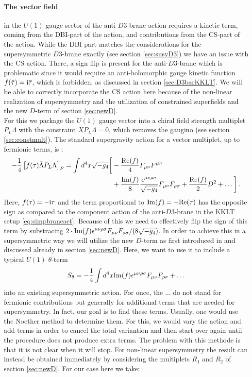\documentclass[a4paper,12pt]{report}
\newcommand{\be}{\begin{equation}}
\newcommand{\ee}{\end{equation}}
\newcommand{\bea}{\begin{equation}\begin{aligned}}
\newcommand{\eea}{\end{aligned}\end{equation}}
\def\rmi{{\rm i}}
\def\rmre{{\rm Re}}
\def\rmim{{\rm Im}}
\begin{document}
\paragraph{The vector field} in the $U(1)$ gauge sector of the anti-$D3$-brane action requires a kinetic term, coming from the DBI-part of the action, and contributions from the CS-part of the action. While the DBI part matches the considerations for the supersymmetric $D3$-brane exactly (see section \ref{sec:susyD3}) we have an issue with the CS action. There, a sign flip is present for the anti-$D3$-brane which is problematic since it would require an anti-holomorphic gauge kinetic function $f(\bar{\tau}) = \rmi \bar{\tau}$, which is forbidden, as discussed in section \ref{sec:D3barKKLT}. We will be able to correctly incorporate the CS action here because of the non-linear realization of supersymmetry and the utilization of constrained superfields and the new $D$-term of section \ref{sec:newD}.\\
For this we package the $U(1)$ gauge vector into a chiral field strength multiplet $P_L\Lambda$ with the constraint $X P_L\Lambda = 0$, which removes the gaugino (see section \ref{sec:constmult}). The standard supergravity action for a vector multiplet, up to fermionic terms, is \cite{Freedman:2012zz}:
\bea
-\frac{1}{4} \left[f(\tau)\bar{\Lambda}P_L\Lambda\right]_F = \int d^4x \sqrt{-g_4}\bigg[&-\frac{\rmre(f)}{4} F_{\mu\nu}F^{\mu\nu}\\
&+\frac{\rmim(f)}{8}\frac{\epsilon^{\mu\nu\rho\sigma}}{\sqrt{-g_4}}F_{\mu\nu}F_{\rho\sigma}+\frac{\rmre(f)}{2}D^2 + \dots \bigg]\,.
\eea
Here, $f(\tau) = -\rmi \tau$ and the term proportional to $\rmim(f)=-\rmre(\tau)$ has the opposite sign as compared to the component action of the anti-$D3$-brane in the KKLT setup \eqref{eq:simpbraneact}. Because of this we need to effectively flip the sign of this term by substracing $2 \cdot \rmim(f) \epsilon^{\nu\nu\rho\sigma}F_{\mu\nu}F_{\rho\sigma}/(8 \sqrt{-g_4})$. In order to achieve this in a supersymmetric way we will utilize the new $D$-term as first introduced in \cite{Cribiori:2017laj} and discussed already in section \ref{sec:newD}. Here, we want to use it to include a typical $U(1)$ $\theta$-term
\be 
S_{\theta} = -\frac{1}{4} \int d^4x \rmim(f)\epsilon^{\mu\nu\rho\sigma}F_{\mu\nu}F_{\rho\sigma} + \ldots
\label{eq:Stheta}
\ee
into an existing supersymmetric action. For once, the $\ldots$ do not stand for fermionic contributions but generally for additional terms that are needed for supersymmetry. In fact, our goal is to find these terms. Usually, one would use the Noether method to determine them. For this, we would vary the action and add terms in order to cancel the total variantion and then start over again until the procedure does not produce extra terms. The problem with this methode is that it is not clear when it will stop. For non-linear supersymmetry the result can instead be obtained immediately by considering the multiplets $R_1$ and $R_2$ of section \ref{sec:newD}. For our case here we take:
\end{document}
